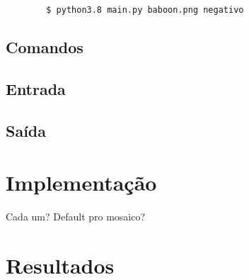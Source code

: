 \documentclass[assignment = 0]{homework}
\begin{document}
    \begin{verbatim}
        $ python3.8 main.py baboon.png negativo
    \end{verbatim}

    \subsection{Comandos}
    \subsection{Entrada}
    \subsection{Saída}

    \section{Implementação}
    Cada um? Default pro mosaico?

    \section{Resultados}
\end{document}
